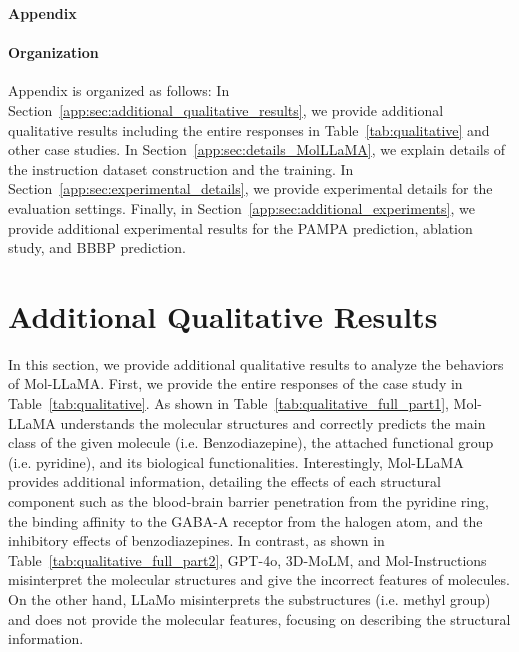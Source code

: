 \newpage
\appendix
\onecolumn
\begin{center}{\bf {\LARGE Appendix}}\end{center}
\paragraph{Organization} Appendix is organized as follows: In Section~\ref{app:sec:additional_qualitative_results}, we provide additional qualitative results including the entire responses in Table~\ref{tab:qualitative} and other case studies. In Section~\ref{app:sec:details_MolLLaMA}, we explain details of the instruction dataset construction and the training. In Section~\ref{app:sec:experimental_details}, we provide experimental details for the evaluation settings. Finally, in Section~\ref{app:sec:additional_experiments}, we provide additional experimental results for the PAMPA prediction, ablation study, and BBBP prediction.

\vspace{-0.1in}
\section{Additional Qualitative Results\label{app:sec:additional_qualitative_results}}
\vspace{-0.05in}
In this section, we provide additional qualitative results to analyze the behaviors of Mol-LLaMA. First, we provide the entire responses of the case study in Table~\ref{tab:qualitative}. As shown in Table~\ref{tab:qualitative_full_part1}, Mol-LLaMA understands the molecular structures and correctly predicts the main class of the given molecule (i.e. Benzodiazepine), the attached functional group (i.e. pyridine), and its biological functionalities. Interestingly, Mol-LLaMA provides additional information, detailing the effects of each structural component such as the blood-brain barrier penetration from the pyridine ring, the binding affinity to the GABA-A receptor from the halogen atom, and the inhibitory effects of benzodiazepines. In contrast, as shown in Table~\ref{tab:qualitative_full_part2}, GPT-4o, 3D-MoLM, and Mol-Instructions misinterpret the molecular structures and give the incorrect features of molecules. On the other hand, LLaMo misinterprets the substructures (i.e. methyl group) and does not provide the molecular features, focusing on describing the structural information.

